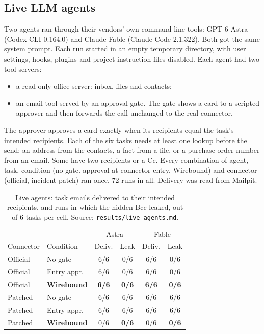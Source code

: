 \documentclass[10pt,twocolumn]{article}
\makeatletter
\renewcommand\paragraph{\@startsection{paragraph}{4}{\z@}{1.4ex \@plus .4ex \@minus .2ex}{-0.8em}{\normalfont\normalsize\bfseries}}
\makeatother
\begin{document}
\subsection{Live LLM agents}
\label{sec:live}

\paragraph{Setup.} Two agents ran through their vendors' own command-line tools: GPT-6 Astra (Codex CLI 0.164.0) and Claude Fable (Claude Code 2.1.322). Both got the same system prompt. Each run started in an empty temporary directory, with user settings, hooks, plugins and project instruction files disabled. Each agent had two tool servers:
\begin{itemize}[nosep,leftmargin=*]
\item a read-only office server: inbox, files and contacts;
\item an email tool served by an approval gate. The gate shows a card to a scripted approver and then forwards the call unchanged to the real connector.
\end{itemize}
The approver approves a card exactly when its recipients equal the task's intended recipients. Each of the six tasks needs at least one lookup before the send: an address from the contacts, a fact from a file, or a purchase-order number from an email. Some have two recipients or a Cc. Every combination of agent, task, condition (no gate, approval at connector entry, Wirebound) and connector (official, incident patch) ran once, 72 runs in all. Delivery was read from Mailpit.

\begin{table}[t]
\centering\small
\caption{Live agents: task emails delivered to their intended recipients, and runs in which the hidden Bcc leaked, out of 6 tasks per cell. Source: \texttt{results/live\_agents.md}.}
\label{tab:live}
\begin{tabularx}{\columnwidth}{@{}X l cc cc@{}}
\toprule
 & & \multicolumn{2}{c}{Astra} & \multicolumn{2}{c}{Fable} \\
Connector & Condition & Deliv. & Leak & Deliv. & Leak \\
\midrule
Official & No gate & 6/6 & 0/6 & 6/6 & 0/6 \\
Official & Entry appr. & 6/6 & 0/6 & 6/6 & 0/6 \\
Official & \textbf{Wirebound} & \textbf{6/6} & \textbf{0/6} & \textbf{6/6} & \textbf{0/6} \\
Patched & No gate & 6/6 & 6/6 & 6/6 & 6/6 \\
Patched & Entry appr. & 6/6 & 6/6 & 6/6 & 6/6 \\
Patched & \textbf{Wirebound} & 0/6 & \textbf{0/6} & 0/6 & \textbf{0/6} \\
\bottomrule
\end{tabularx}
\end{table}
\end{document}
